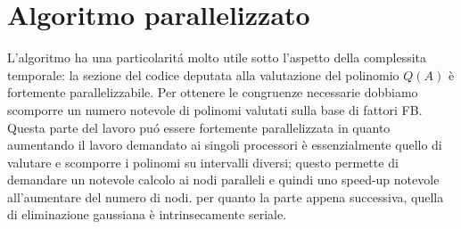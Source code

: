 
\section{Algoritmo parallelizzato}
\label{sec:parallelo}

L'algoritmo ha una particolarit\'{a} molto utile sotto l'aspetto della complessita temporale:
la sezione del codice deputata alla valutazione del polinomio $Q(A)$ è fortemente parallelizzabile.
Per ottenere le congruenze necessarie dobbiamo scomporre un numero notevole di polinomi valutati 
sulla base di fattori FB.
Questa parte del lavoro pu\'{o} essere fortemente parallelizzata in quanto aumentando 
il lavoro demandato ai singoli processori è essenzialmente quello di valutare e scomporre i polinomi
su intervalli diversi; questo permette di demandare un notevole calcolo ai nodi paralleli e quindi uno speed-up notevole all'aumentare del numero di nodi.
per quanto la parte appena successiva, quella di eliminazione gaussiana è intrinsecamente seriale.


%


